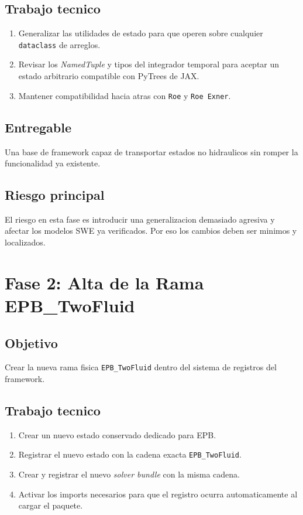 \documentclass[11pt]{article}
\begin{document}
\subsection*{Trabajo tecnico}

\begin{enumerate}[label=\arabic*.]
    \item Generalizar las utilidades de estado para que operen sobre cualquier \texttt{dataclass} de arreglos.
    \item Revisar los \emph{NamedTuple} y tipos del integrador temporal para aceptar un estado arbitrario compatible con PyTrees de JAX.
    \item Mantener compatibilidad hacia atras con \texttt{Roe} y \texttt{Roe Exner}.
\end{enumerate}

\subsection*{Entregable}

Una base de framework capaz de transportar estados no hidraulicos sin romper la funcionalidad ya existente.

\subsection*{Riesgo principal}

El riesgo en esta fase es introducir una generalizacion demasiado agresiva y afectar los modelos SWE ya verificados. Por eso los cambios deben ser minimos y localizados.

\section{Fase 2: Alta de la Rama EPB\_TwoFluid}

\subsection*{Objetivo}

Crear la nueva rama fisica \texttt{EPB\_TwoFluid} dentro del sistema de registros del framework.

\subsection*{Trabajo tecnico}

\begin{enumerate}[label=\arabic*.]
    \item Crear un nuevo estado conservado dedicado para EPB.
    \item Registrar el nuevo estado con la cadena exacta \texttt{EPB\_TwoFluid}.
    \item Crear y registrar el nuevo \emph{solver bundle} con la misma cadena.
    \item Activar los imports necesarios para que el registro ocurra automaticamente al cargar el paquete.
\end{enumerate}
\end{document}
